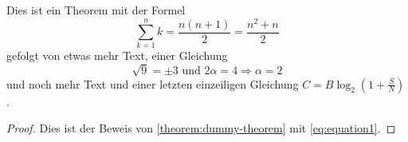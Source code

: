 \begin{theorem}\label{theorem:dummy-theorem}
Dies ist ein Theorem mit der Formel
\begin{equation}
\label{eq:equation1}
\sum_{k=1}^n k=\frac{n(n+1)}{2}=\frac{n^2+n}{2}
\end{equation}
gefolgt von etwas mehr Text, einer Gleichung
$$\sqrt{9}=\pm3\text{ und }2\alpha=4\Rightarrow\alpha=2$$
und noch mehr Text und einer letzten einzeiligen Gleichung \(C = B \log_2 \left(1 + \frac{S}{N} \right) \).
\end{theorem}

\begin{proof}
Dies ist der Beweis von \cref{theorem:dummy-theorem} mit \cref{eq:equation1}.
\end{proof}
